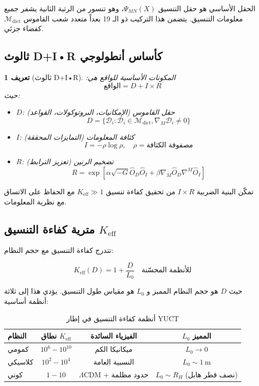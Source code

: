 \documentclass[11pt,a4paper]{article}
\newcommand{\Mdict}{\mathcal{M}_{\text{dict}}}
\newcommand{\Dict}{\mathcal{D}}
\newtheorem{definition}[theorem]{تعريف}
\theoremstyle{remark}
\newcommand{\Keff}{K_{\mathrm{eff}}}
\begin{document}
	الحقل الأساسي هو حقل التنسيق $\Psi_{MN}(X)$، وهو تنسور من الرتبة الثانية يشفر جميع معلومات التنسيق. يتضمن هذا التركيب ذو الـ 19 بعداً متعدد شعب القاموس $\Mdict$ كفضاء جزئي.
	
	\subsection{ثالوث D+I•R كأساس أنطولوجي}
	
	\begin{definition}[ثالوث D+I•R]
		المكونات الأساسية للواقع هي:
		\[
		\text{الواقع} = D + I \times R
		\]
		حيث:
		\begin{itemize}
			\item $D$: حقل القاموس (الإمكانيات، البروتوكولات، القواعد)
			\[
			D = \{\Dict_i : \Dict_i \in \Mdict, \nabla_M \Dict_i \neq 0\}
			\]
			\item $I$: كثافة المعلومات (التمايزات المحققة)
			\[
			I = -\rho \log \rho, \quad \rho = \text{مصفوفة الكثافة}
			\]
			\item $R$: تضخيم الرنين (تعزيز الترابط)
			\[
			R = \exp\left[\alpha \sqrt{-G} \hat{O}_D \hat{O}_I + \beta \nabla_M\hat{O}_D \nabla^M\hat{O}_I\right]
			\]
		\end{itemize}
	\end{definition}
	
	تمكّن البنية الضربية $I \times R$ من تحقيق كفاءة تنسيق $\Keff \gg 1$ مع الحفاظ على الاتساق مع نظرية المعلومات.
	
	\subsection[مترية كفاءة التنسيق K eff]{مترية كفاءة التنسيق $\Keff$}
	
	تتدرج كفاءة التنسيق مع حجم النظام:
	
	\begin{equation}
		\Keff(D) = 1 + \frac{D}{L_0} \quad \text{للأنظمة المحسّنة}
	\end{equation}
	
	حيث $D$ هو حجم النظام المميز و $L_0$ هو مقياس طول التنسيق. يؤدي هذا إلى ثلاثة أنظمة أساسية:
	
	\begin{table}[htbp]
		\centering
		\begin{tabular}{lccc}
			\toprule
			\textbf{النظام} & \textbf{نطاق $\Keff$} & \textbf{الفيزياء السائدة} & \textbf{$L_0$ المميز} \\
			\midrule
			كمومي & $10^6 - 10^{10}$ & ميكانيكا الكم & $L_0 \to 0$ \\
			كلاسيكي & $10^2 - 10^4$ & النسبية العامة & $L_0 \sim 1\ \text{m}$ \\
			كوني & $1 - 10$ & $\Lambda$CDM + حدود مظلمة & $L_0 \sim R_H$ (نصف قطر هابل) \\
			\bottomrule
		\end{tabular}
		\caption{أنظمة كفاءة التنسيق في إطار YUCT}
		\label{tab:keff-regimes}
	\end{table}
	
\end{document}
